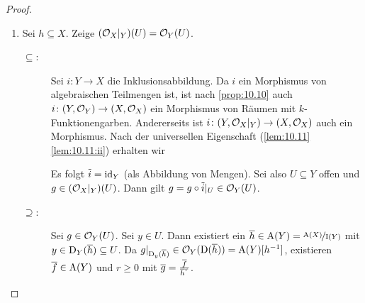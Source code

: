 \documentclass[12pt,a4paper]{scrartcl}
\theoremstyle{cplain}
\theoremstyle{cdef}
\begin{document}
\begin{proof}
	\leavevmode
	\begin{enumerate}[label=\ref{lem:10.13:\roman*}]
		\item Sei $h\subseteq X$. Zeige $(\mathcal{O}_X|_Y)(U) = \mathcal{O}_Y(U)$. 
		\begin{description}
			\item[\glqq$\subseteq$\grqq:] Sei $i\colon Y\to X$ die Inklusionsabbildung. Da $i$ ein Morphismus von algebraischen Teilmengen ist, ist nach \cref{prop:10.10} auch $i\colon (Y,\mathcal{O}_Y)\to (X,\mathcal{O}_X)$ ein Morphismus von Räumen mit $k$-Funktionengarben. Andererseits ist $i\colon (Y,\mathcal{O}_X|_Y)\to (X,\mathcal{O}_X)$ auch ein Morphismus. Nach der universellen Eigenschaft (\cref{lem:10.11} \ref{lem:10.11:ii}) erhalten wir
			\begin{center}
			\end{center}
			Es folgt $\tilde i = \operatorname{id}_Y$ (als Abbildung von Mengen). Sei also $U\subseteq Y$ offen und $g\in(\mathcal{O}_X|_Y)(U)$. Dann gilt $g = g\circ \tilde i|_U \in \mathcal{O}_Y(U)$.
			\item[\glqq$\supseteq$\grqq:] Sei $g\in\mathcal{O}_Y(U)$. Sei $y\in U$. Dann existiert ein $\overline{h}\in \operatorname{A}(Y) = \nicefrac{\operatorname{A}(X)}{\operatorname{I}(Y)}$ mit $y\in \operatorname{D}_Y(\overline{h})\subseteq U$. Da $g|_{\operatorname{D}_y(\overline{h})} \in \mathcal{O}_Y(\operatorname{D}(\overline{h})) = \operatorname{A}(Y)[h^{-1}]$, existieren $\overline{f}\in \operatorname{A}(Y)$ und $r\ge 0$ mit $\overline{g} = \frac {\overline f}{\overline h^r}$.


\end{description}
\end{enumerate}
\end{proof}
\end{document}
